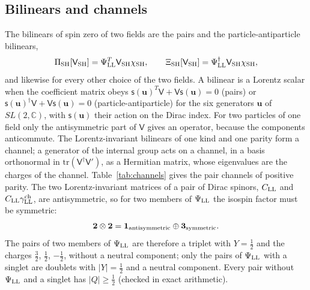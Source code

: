\documentclass[aps,prd,onecolumn,superscriptaddress,nofootinbib,floatfix,longbibliography]{revtex4-2}
\newcommand{\LL}{{\rm LL}}
\newcommand{\SH}{{\rm SH}}
\newcommand{\tr}{\mathrm{tr}}
\begin{document}
\subsection{Bilinears and channels}

The bilinears of spin zero of two fields are the pairs and the particle-antiparticle bilinears,
\begin{equation}
\Pi_\SH[\mathsf V_\SH]=\Psi^T_\LL\mathsf V_\SH\chi_\SH,\qquad \Xi_\SH[\mathsf V_\SH]=\Psi^\dagger_\LL\mathsf V_\SH\chi_\SH ,
\label{eq:bilinears}
\end{equation}
and likewise for every other choice of the two fields. A bilinear is a Lorentz scalar when the coefficient matrix obeys
$\mathsf s(\mathbf u)^T\mathsf V+\mathsf V\mathsf s(\mathbf u)=0$ (pairs) or
$\mathsf s(\mathbf u)^\dagger\mathsf V+\mathsf V\mathsf s(\mathbf u)=0$ (particle-antiparticle) for the six generators
$\mathbf u$ of $SL(2,\mathbb C)$, with $\mathsf s(\mathbf u)$ their action on the Dirac index. For two particles of one field
only the antisymmetric part of $\mathsf V$ gives an operator, because the components anticommute. The Lorentz-invariant
bilinears of one kind and one parity form a channel; a generator of the internal group acts on a channel, in a basis
orthonormal in $\tr(\mathsf V^\dagger\mathsf V')$, as a Hermitian matrix, whose eigenvalues are the charges of the channel.
Table~\ref{tab:channels} gives the pair channels of positive parity. The two Lorentz-invariant matrices of a pair of Dirac
spinors, $C_\LL$ and $C_\LL\gamma^{\rm ch}_\LL$, are antisymmetric, so for two members of $\Psi_\LL$ the isospin factor must be
symmetric:
\begin{equation}
\mathbf 2\otimes\mathbf 2=\mathbf 1_{\rm antisymmetric}\oplus\mathbf 3_{\rm symmetric}.
\label{eq:2x2}
\end{equation}
The pairs of two members of $\Psi_\LL$ are therefore a triplet with $Y=\frac12$ and the charges $\frac32$, $\frac12$,
$-\frac12$, without a neutral component; only the pairs of $\Psi_\LL$ with a singlet are doublets with $|Y|=\frac12$ and a
neutral component. Every pair without $\Psi_\LL$ and a singlet has $|Q|\ge\ensuremath{\tfrac12}$ (checked in exact arithmetic).
\end{document}
